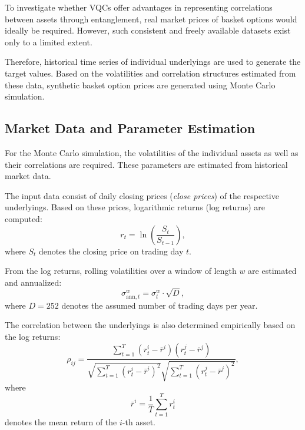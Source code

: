 To investigate whether VQCs offer advantages in representing correlations between assets through entanglement, real market prices of basket options would ideally be required.
However, such consistent and freely available datasets exist only to a limited extent.

Therefore, historical time series of individual underlyings are used to generate the target values.
Based on the volatilities and correlation structures estimated from these data, synthetic basket option prices are generated using Monte Carlo simulation.

\subsection{Market Data and Parameter Estimation}
\label{sec:mt-market-data}

For the Monte Carlo simulation, the volatilities of the individual assets as well as their correlations are required. These parameters are estimated from historical market data.

The input data consist of daily closing prices (\textit{close prices}) of the respective underlyings. Based on these prices, logarithmic returns (log returns) are computed:
\begin{equation}
r_t = \ln\left(\frac{S_t}{S_{t-1}}\right),
\label{eq:log-returns}
\end{equation}
where $S_t$ denotes the closing price on trading day $t$.

From the log returns, rolling volatilities over a window of length $w$ are estimated and annualized:
\begin{equation}
\sigma_{\text{ann}, t}^{w}
=
\sigma_{t}^{w} \cdot \sqrt{D},
\end{equation}
where $D = 252$ denotes the assumed number of trading days per year.

The correlation between the underlyings is also determined empirically based on the log returns:
\begin{equation}
\rho_{ij}
=
\frac{
    \sum_{t=1}^{T}
    \left(r_{t}^{i} - \bar{r}^{i}\right)
    \left(r_{t}^{j} - \bar{r}^{j}\right)
}{
    \sqrt{
        \sum_{t=1}^{T} \left(r_{t}^{i} - \bar{r}^{i}\right)^{2}
    }
    \sqrt{
        \sum_{t=1}^{T} \left(r_{t}^{j} - \bar{r}^{j}\right)^{2}
    }
},
\label{eq:corr}
\end{equation}
where
\begin{equation}
\bar{r}^{i} = \frac{1}{T} \sum_{t=1}^{T} r_{t}^{i}
\end{equation}
denotes the mean return of the $i$-th asset.

